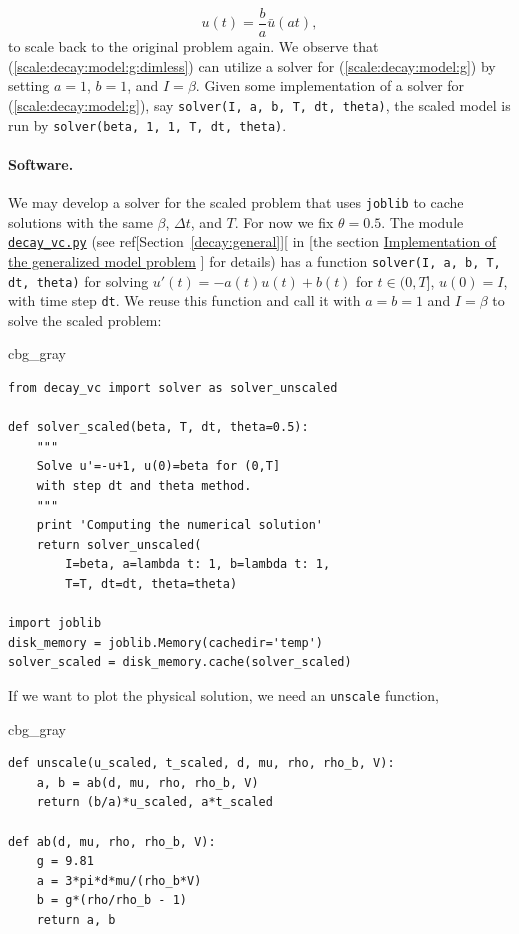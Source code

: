 \documentclass[graybox,envcountchap,sectrefs,final]{svmonodo}
\newenvironment{_cod_tight}[1]{
   \def\FrameCommand{\colorbox{#1}}
   \FrameRule0.6pt\MakeFramed {\FrameRestore}\vskip3mm}
   {\vskip0mm\endMakeFramed}
\newenvironment{cod}[1]{
\bgroup\rmfamily
\fboxsep=0mm\relax
\begin{_cod_tight}{#1}
\list{}{\parsep=-2mm\parskip=0mm\topsep=0pt\leftmargin=2mm
\rightmargin=2\leftmargin\leftmargin=4pt\relax}
\item\relax}
{\endlist\end{_cod_tight}\egroup}
\begin{document}
\begin{equation}
u(t) = \frac{b}{a}\bar u(at),
\end{equation}
to scale back to the original
problem again.
We observe that (\ref{scale:decay:model:g:dimless}) can utilize a solver
for (\ref{scale:decay:model:g}) by setting $a=1$, $b=1$, and $I=\beta$.
Given some implementation of a solver for (\ref{scale:decay:model:g}),
say \texttt{solver(I, a, b, T, dt, theta)},
the scaled model is run by \texttt{solver(beta, 1, 1, T, dt, theta)}.



\paragraph{Software.}
We may develop a solver for the scaled problem that uses \texttt{joblib}
to cache solutions with the same $\beta$, $\Delta t$, and $T$.
For now we fix $\theta=0.5$.
The module \href{{http://tinyurl.com/o8pb3yy/decay_vc.py}}{\nolinkurl{decay_vc.py}}
(see ref[Section~\ref{decay:general}][ in \cite{Langtangen_decay}[the
section \href{{http://hplgit.github.io/decay-book/doc/pub/book/sphinx/._book006.html#implementation-of-the-generalized-model-problem}}{Implementation of the generalized model problem}
\cite{Langtangen_decay}] for details)
has a function
\texttt{solver(I, a, b, T, dt, theta)} for solving $u'(t)=-a(t)u(t)+b(t)$ for
$t\in (0,T]$, $u(0)=I$, with time step \texttt{dt}.
We reuse this function and call it with $a=b=1$ and $I=\beta$ to solve
the scaled problem:

\begin{cod}{cbg_gray}\begin{Verbatim}[numbers=none,fontsize=\fontsize{9pt}{9pt},baselinestretch=0.95,xleftmargin=2mm]
from decay_vc import solver as solver_unscaled

def solver_scaled(beta, T, dt, theta=0.5):
    """
    Solve u'=-u+1, u(0)=beta for (0,T]
    with step dt and theta method.
    """
    print 'Computing the numerical solution'
    return solver_unscaled(
        I=beta, a=lambda t: 1, b=lambda t: 1,
        T=T, dt=dt, theta=theta)

import joblib
disk_memory = joblib.Memory(cachedir='temp')
solver_scaled = disk_memory.cache(solver_scaled)
\end{Verbatim}
\end{cod}
\noindent
If we want to plot the physical solution, we need an \texttt{unscale} function,

\begin{cod}{cbg_gray}\begin{Verbatim}[numbers=none,fontsize=\fontsize{9pt}{9pt},baselinestretch=0.95,xleftmargin=2mm]
def unscale(u_scaled, t_scaled, d, mu, rho, rho_b, V):
    a, b = ab(d, mu, rho, rho_b, V)
    return (b/a)*u_scaled, a*t_scaled

def ab(d, mu, rho, rho_b, V):
    g = 9.81
    a = 3*pi*d*mu/(rho_b*V)
    b = g*(rho/rho_b - 1)
    return a, b
\end{Verbatim}
\end{cod}
\noindent
\end{document}
